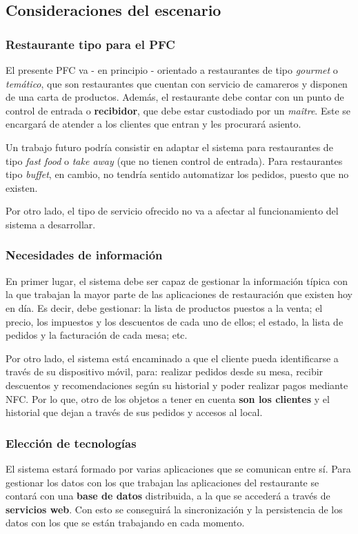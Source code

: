   \subsection{Consideraciones del escenario}
    \subsubsection{Restaurante tipo para el \acs{PFC}}
  El presente \acs{PFC} va - en principio - orientado a restaurantes de tipo
  \emph{gourmet} o \emph{temático}, que son restaurantes que cuentan con
  servicio de camareros y disponen de una carta de productos. Además, el
  restaurante debe contar con un punto de  control de entrada o
  \textbf{recibidor}, que debe estar custodiado por un \emph{maître}. Este se
  encargará de atender a los clientes que entran y les procurará asiento.

  Un trabajo futuro podría consistir en adaptar el sistema para restaurantes 
  de tipo \emph{fast food} o \emph{take away} (que no tienen control de 
  entrada). Para restaurantes tipo \emph{buffet}, en cambio, no tendría
  sentido automatizar los pedidos, puesto que no existen.

  Por otro lado, el tipo de servicio ofrecido no va a afectar al funcionamiento
  del sistema a desarrollar.

    \subsubsection{Necesidades de información}
  En primer lugar, el sistema debe ser capaz de gestionar la información
  típica con la que trabajan la mayor parte de las aplicaciones de
  restauración que existen hoy en día. Es decir, debe gestionar: la lista
  de productos puestos a la venta; el precio, los impuestos y los
  descuentos de cada uno de ellos; el estado, la lista de pedidos y la
  facturación de cada mesa; etc.

  Por otro lado, el sistema está encaminado a que el cliente pueda 
  identificarse a través de su dispositivo móvil, para: realizar
  pedidos desde su mesa, recibir descuentos y recomendaciones según su
  historial y poder realizar pagos mediante \acs{NFC}. Por lo que, otro de los
  objetos a tener en cuenta \textbf{son los clientes} y el historial que dejan
  a través de sus pedidos y accesos al local.

    \subsubsection{Elección de tecnologías}
  El sistema estará formado por varias aplicaciones que se comunican entre sí.
  Para gestionar los datos con los que trabajan las aplicaciones del
  restaurante se contará con una \textbf{base de datos} distribuida, a la que
  se accederá a través de \textbf{servicios web}. Con esto se conseguirá la
  sincronización y la persistencia de los datos con los que se están trabajando
  en cada momento.

